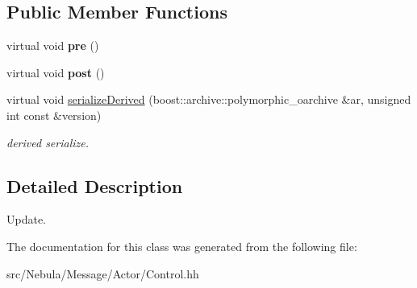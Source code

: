 \subsection*{\-Public \-Member \-Functions}
\begin{DoxyCompactItemize}
\item 
\hypertarget{classNeb_1_1Message_1_1Actor_1_1Control_1_1RigidBody_1_1OUpdate_ab9dbc3bc64d7c27e04b2f9b797b2af8f}{virtual void {\bfseries pre} ()}\label{classNeb_1_1Message_1_1Actor_1_1Control_1_1RigidBody_1_1OUpdate_ab9dbc3bc64d7c27e04b2f9b797b2af8f}

\item 
\hypertarget{classNeb_1_1Message_1_1Actor_1_1Control_1_1RigidBody_1_1OUpdate_aa1e020d258f812ba779e8677dc7ca6ee}{virtual void {\bfseries post} ()}\label{classNeb_1_1Message_1_1Actor_1_1Control_1_1RigidBody_1_1OUpdate_aa1e020d258f812ba779e8677dc7ca6ee}

\item 
\hypertarget{classNeb_1_1Message_1_1Actor_1_1Control_1_1RigidBody_1_1OUpdate_a89be641ebfae2b837904651bfa5fb9ce}{virtual void \hyperlink{classNeb_1_1Message_1_1Actor_1_1Control_1_1RigidBody_1_1OUpdate_a89be641ebfae2b837904651bfa5fb9ce}{serialize\-Derived} (boost\-::archive\-::polymorphic\-\_\-oarchive \&ar, unsigned int const \&version)}\label{classNeb_1_1Message_1_1Actor_1_1Control_1_1RigidBody_1_1OUpdate_a89be641ebfae2b837904651bfa5fb9ce}

\begin{DoxyCompactList}\small\item\em derived serialize. \end{DoxyCompactList}\end{DoxyCompactItemize}


\subsection{\-Detailed \-Description}
\-Update. 

\-The documentation for this class was generated from the following file\-:\begin{DoxyCompactItemize}
\item 
src/\-Nebula/\-Message/\-Actor/\-Control.\-hh\end{DoxyCompactItemize}
